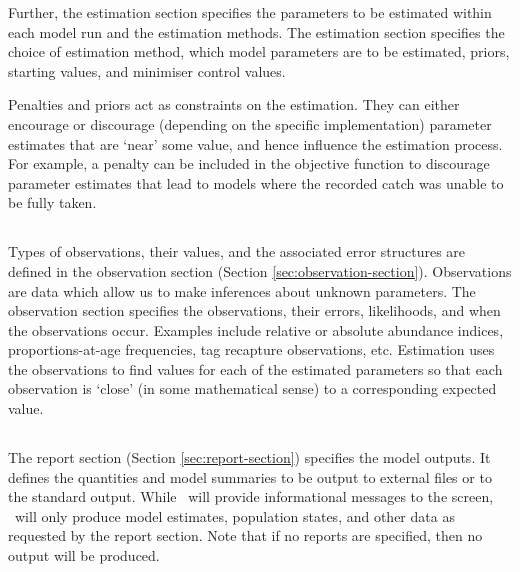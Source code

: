 Further, the estimation section specifies the parameters to be estimated within each model run and the estimation methods. The estimation section specifies the choice of estimation method, which model parameters are to be estimated, priors, starting values, and minimiser control values.

Penalties and priors act as constraints on the estimation. They can either encourage or discourage (depending on the specific implementation) parameter estimates that are `near' some value, and hence influence the estimation process. For example, a penalty can be included in the objective function to discourage parameter estimates that lead to models where the recorded catch was unable to be fully taken.

\subsection{}
Types of observations, their values, and the associated error structures are defined in the observation section (Section \ref{sec:observation-section}). Observations are data which allow us to make inferences about unknown parameters. The observation section specifies the observations, their errors, likelihoods, and when the observations occur. Examples include relative or absolute abundance indices, proportions-at-age frequencies, tag recapture observations, etc. Estimation uses the observations to find values for each of the estimated parameters so that each observation is `close' (in some mathematical sense) to a corresponding expected value. 

\subsection{}
The report section (Section \ref{sec:report-section}) specifies the model outputs. It defines the quantities and model summaries to be output to external files or to the standard output. While \CNAME\ will provide informational messages to the screen, \CNAME\ will only produce model estimates, population states, and other data as requested by the report section. Note that if no reports are specified, then no output will be produced.

